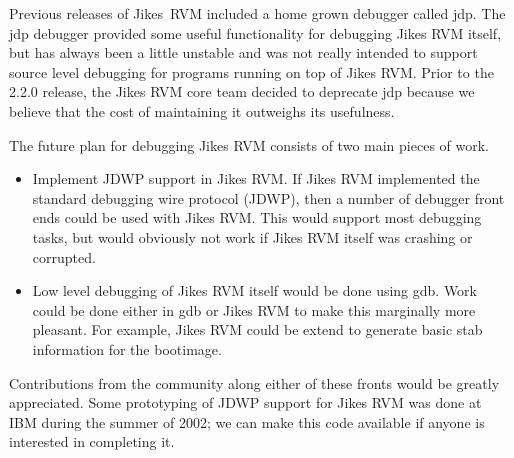 Previous releases of Jikes\JikesTMFootnote\ RVM included a home grown
debugger called jdp. The jdp debugger provided some useful
functionality for debugging Jikes RVM itself, but has always been a
little unstable and was not really intended to support source level
debugging for programs running on top of Jikes RVM. Prior to the 2.2.0
release, the Jikes RVM core team decided to deprecate jdp because we
believe that the cost of maintaining it outweighs its usefulness.

The future plan for debugging Jikes RVM consists of two main pieces of
work. 
\begin{itemize}
\item Implement JDWP support in Jikes RVM. If Jikes RVM implemented
the standard debugging wire protocol (JDWP), then a number of debugger
front ends could be used with Jikes RVM.  This would support most
debugging tasks, but would obviously not work if Jikes RVM itself was
crashing or corrupted.
\item Low level debugging of Jikes RVM itself would be done using
gdb. Work could be done either in gdb or Jikes RVM to make this
marginally more pleasant.  For example, Jikes RVM could be extend to
generate basic stab information for the bootimage.
\end{itemize}
Contributions from the community along either of these fronts would be
greatly appreciated.  Some prototyping of JDWP support for Jikes RVM
was done at IBM during the summer of 2002; we can make this code
available if anyone is interested in completing it.



